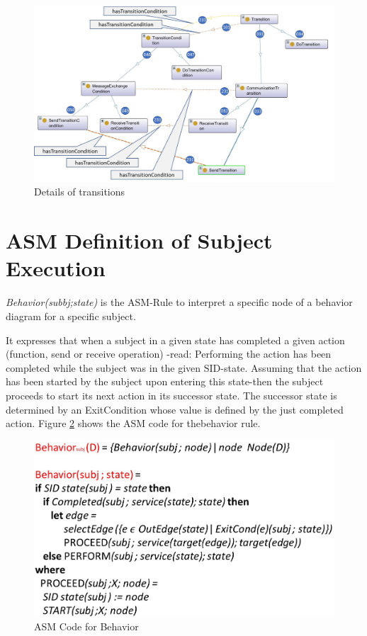 \begin{figure}[ph]
	\centering
	\includegraphics[width=1.0\linewidth]{20181026-Ontologie-Bilder/Grafiken-Ontologie/SUbjectExecution/20190105-Transitions}
	\caption[Details of transitions]{Details of transitions}
	\label{fig:20190105-transitions}
\end{figure}

\newpage




\section{ASM Definition of Subject Execution}

 \textit{Behavior(subbj;state)} is the ASM-Rule to interpret a specific node of a behavior diagram for a specific subject.
 
 It expresses that when a subject in a given state has completed a given action (function, send or receive
 operation) -read: Performing the action has been completed while the subject
 was in the given SID-state. Assuming that the action has been started by the
 subject upon entering this state-then the subject proceeds to start its next
 action in its successor state. The successor state is determined by an ExitCondition whose
 value is defined by the just completed action. Figure \ref{fig:asm-behavior} shows the ASM code for thebehavior rule.

\begin{figure}[ph]
	\centering
	\includegraphics[width=0.7\linewidth]{20181026-Ontologie-Bilder/Grafiken-Ontologie/SUbjectExecution/ASM-Behavior}
	\caption[ASM Code for Behavior]{ASM Code for Behavior}
	\label{fig:asm-behavior}
\end{figure}

